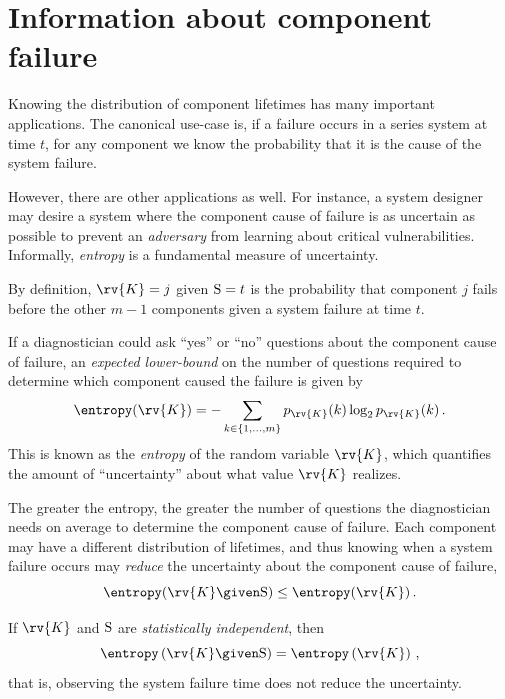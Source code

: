 \documentclass[../main.tex]{subfiles}
\begin{document}
\label{sec:entropy}
\chapter{Information about component failure}
Knowing the distribution of component lifetimes has many important applications. The canonical use-case is, if a failure occurs in a series system at time $t$, for any component we know the probability that it is the cause of the system failure.

However, there are other applications as well. For instance, a system designer may desire a system where the component cause of failure is as uncertain as possible to prevent an \emph{adversary} from learning about critical vulnerabilities. Informally, \emph{entropy} is a fundamental measure of uncertainty.

By definition, $\rv{K} = j$ given $\mathrm{S} = t$ is the probability that component $j$ fails before the other $m-1$ components given a system failure at time $t$.

If a diagnostician could ask ``yes'' or ``no'' questions about the component cause of failure, an \emph{expected lower-bound} on the number of questions required to determine which component caused the failure is given by
\begin{equation}
    \entropy(\rv{K}) = -\sum_{k \in \{1,\ldots,m\}} \pmf_{\rv{K}}(k) \log_2 \pmf_{\rv{K}}(k)\,.
\end{equation}
This is known as the \emph{entropy} of the random variable $\rv{K}$, which quantifies the amount of ``uncertainty'' about what value $\rv{K}$ realizes.

The greater the entropy, the greater the number of questions the diagnostician needs on average to determine the component cause of failure. Each component may have a different distribution of lifetimes, and thus knowing when a system failure occurs may \emph{reduce} the uncertainty about the component cause of failure,
\begin{equation}
    \entropy(\rv{K} \given \sv) \leq \entropy(\rv{K})\,.
\end{equation}


If $\rv{K}$ and $\mathrm{S}$ are \emph{statistically independent}, then
\begin{equation}
    \entropy\left(\rv{K} \given \sv\right) = \entropy\left(\rv{K}\right)\,,
\end{equation}
that is, observing the system failure time does not reduce the uncertainty.
\end{document}
